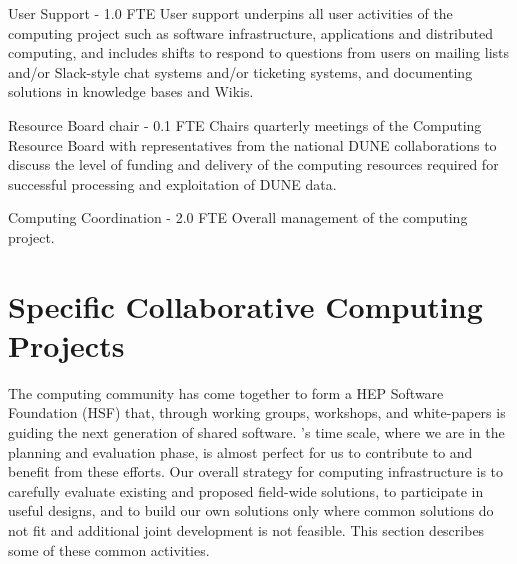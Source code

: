 \begin{description}
\item {User Support - 1.0 FTE}
User support underpins all user activities of the computing project such as software infrastructure, applications and distributed computing, and includes shifts to respond to questions from users on mailing lists and/or Slack-style chat systems and/or ticketing systems, and documenting solutions in knowledge bases and Wikis.%

\item {Resource Board chair - 0.1 FTE}
Chairs quarterly meetings of the Computing Resource Board with representatives from the national DUNE collaborations to discuss the level of funding and delivery of the computing resources required for successful processing and exploitation of DUNE data. %

\item {Computing Coordination - 2.0 FTE}
Overall management of the computing project. %

\end{description}



\section{Specific Collaborative Computing Projects}
\label{ch:exec-comp-gov-coop}

The  computing community has come together to form a HEP Software Foundation (HSF)\cite{Alves:2017she} that, through working groups, workshops, and white-papers is guiding the next generation of shared  software.  's time scale, where we are in the planning and evaluation phase, is almost perfect for us to contribute to and benefit from these efforts.  Our overall strategy for computing infrastructure is to carefully evaluate existing and proposed field-wide solutions, to participate in useful designs, and to build our own solutions only where common solutions do not fit and additional joint development is not feasible.   This section describes some of these common activities. 



